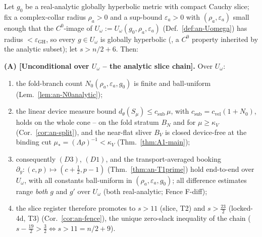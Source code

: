 \begin{theorem}
\label{thm:an17:E2a-omega-main}
Let $g_0$ be a real-analytic globally hyperbolic metric with compact
Cauchy slice; fix a complex-collar radius $\rho_a>0$ and a sup-bound
$\varepsilon_a>0$ with $(\rho_a,\varepsilon_a)$ small enough that the
$C^0$-image of $U_\omega:=U_\omega(g_0,\rho_a,\varepsilon_a)$
(Def.~\ref{def:an-Uomega}) has radius $<\varepsilon_{\mathrm{GH}}$, so
every $g\in U_\omega$ is globally hyperbolic
(\cite{ChruscielGrant2012}, a $C^0$ property inherited by the analytic
subset); let $s>n/2+6$.  Then:

\smallskip
\textup{\textbf{(A) [Unconditional over $U_\omega$ -- the analytic slice
chain].}}  Over $U_\omega$:
\begin{enumerate}[label=\textup{(A\arabic*)},leftmargin=*,nosep]
  \item the fold-branch count $N_0(\rho_a,\varepsilon_a,g_0)$ is finite
    and ball-uniform (Lem.~\ref{lem:an-N0analytic});
  \item the linear device measure bound
    $d_\theta(S_\mu)\le c_{\mathrm{sub}}\,\mu$, with
    $c_{\mathrm{sub}}=c_{\mathrm{vel}}(1+N_0)$, holds on the whole cone --
    on the fold stratum $B_N$ and for $\mu\ge\kappa_V$
    (Cor.~\ref{cor:an-split}), and the near-flat sliver $B_V$ is closed
    device-free at the binding cut $\mu_*=(\Lambda\rho)^{-1}<\kappa_V$
    (Thm.~\ref{thm:A1-main});
  \item consequently $(D3)$, $(D1)$, and the transport-averaged booking
    $\partial_y:(c,p)\mapsto(c+\tfrac12,p-1)$
    (Thm.~\ref{thm:an-T1prime}) hold end-to-end over $U_\omega$, with all
    constants ball-uniform in $(\rho_a,\varepsilon_a,g_0)$; all
    difference estimates range \emph{both} $g$ and $g'$ over $U_\omega$
    (both real-analytic; Fence F-diff);
  \item the slice register therefore promotes to $s>11$ (slice, T2) and
    $s>\tfrac{23}{2}$ (locked-4d, T3) (Cor.~\ref{cor:an-fence}), the
    unique zero-slack inequality of the chain
    ($s-\tfrac{19}{2}>\tfrac32\iff s>11=n/2+9$).
\end{enumerate}


\end{theorem}
